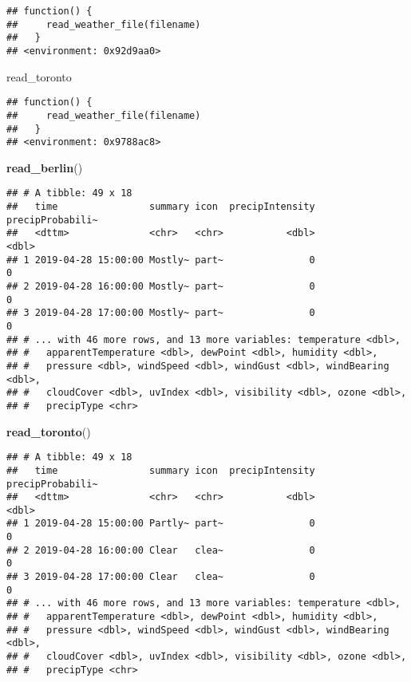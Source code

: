 \documentclass[]{book}
\newenvironment{Shaded}{\begin{snugshade}}{\end{snugshade}}
\newcommand{\KeywordTok}[1]{\textcolor[rgb]{0.13,0.29,0.53}{\textbf{#1}}}
\newcommand{\NormalTok}[1]{#1}
\begin{document}
\begin{verbatim}
## function() {
##     read_weather_file(filename)
##   }
## <environment: 0x92d9aa0>
\end{verbatim}

\begin{Shaded}
\begin{Highlighting}[]
\NormalTok{read_toronto}
\end{Highlighting}
\end{Shaded}

\begin{verbatim}
## function() {
##     read_weather_file(filename)
##   }
## <environment: 0x9788ac8>
\end{verbatim}

\begin{Shaded}
\begin{Highlighting}[]
\KeywordTok{read_berlin}\NormalTok{()}
\end{Highlighting}
\end{Shaded}

\begin{verbatim}
## # A tibble: 49 x 18
##   time                summary icon  precipIntensity precipProbabili~
##   <dttm>              <chr>   <chr>           <dbl>            <dbl>
## 1 2019-04-28 15:00:00 Mostly~ part~               0                0
## 2 2019-04-28 16:00:00 Mostly~ part~               0                0
## 3 2019-04-28 17:00:00 Mostly~ part~               0                0
## # ... with 46 more rows, and 13 more variables: temperature <dbl>,
## #   apparentTemperature <dbl>, dewPoint <dbl>, humidity <dbl>,
## #   pressure <dbl>, windSpeed <dbl>, windGust <dbl>, windBearing <dbl>,
## #   cloudCover <dbl>, uvIndex <dbl>, visibility <dbl>, ozone <dbl>,
## #   precipType <chr>
\end{verbatim}

\begin{Shaded}
\begin{Highlighting}[]
\KeywordTok{read_toronto}\NormalTok{()}
\end{Highlighting}
\end{Shaded}

\begin{verbatim}
## # A tibble: 49 x 18
##   time                summary icon  precipIntensity precipProbabili~
##   <dttm>              <chr>   <chr>           <dbl>            <dbl>
## 1 2019-04-28 15:00:00 Partly~ part~               0                0
## 2 2019-04-28 16:00:00 Clear   clea~               0                0
## 3 2019-04-28 17:00:00 Clear   clea~               0                0
## # ... with 46 more rows, and 13 more variables: temperature <dbl>,
## #   apparentTemperature <dbl>, dewPoint <dbl>, humidity <dbl>,
## #   pressure <dbl>, windSpeed <dbl>, windGust <dbl>, windBearing <dbl>,
## #   cloudCover <dbl>, uvIndex <dbl>, visibility <dbl>, ozone <dbl>,
## #   precipType <chr>
\end{verbatim}
\end{document}

